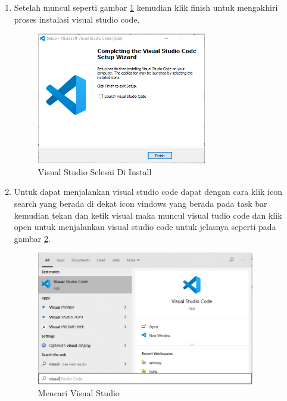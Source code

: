 \begin{enumerate}
\item Setelah muncul seperti gambar \ref{V11} kemudian klik finish untuk mengakhiri proses instalasi visual studio code. 
\begin{figure}[!htbp]
	\centerline{\includegraphics[width=0.70\textwidth]{figures/vs/11.png}}
	\caption{Visual Studio Selesai Di Install}
	\label{V11}
\end{figure}
 
\item Untuk dapat menjalankan visual studio code dapat dengan cara klik icon search yang berada di dekat icon vindows yang berada pada task bar kemudian tekan dan ketik visual maka muncul visual tudio code dan klik open untuk menjalankan visual studio code untuk jelasnya seperti pada gambar \ref{V12}. 

\begin{figure}[!htbp]
	\centerline{\includegraphics[width=0.90\textwidth]{figures/vs/12.png}}
	\caption{Mencari Visual Studio}
	\label{V12}
\end{figure}



\end{enumerate}
